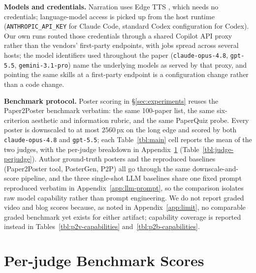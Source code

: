 \documentclass{article}
\begin{document}
\textbf{Models and credentials.} Narration uses Edge TTS \citep{edgetts}, which needs no credentials; language-model access is picked up from the host runtime (\texttt{ANTHROPIC\_API\_KEY} for Claude Code, standard Codex configuration for Codex). Our own runs routed those credentials through a shared Copilot API proxy rather than the vendors' first-party endpoints, with jobs spread across several hosts; the model identifiers used throughout the paper (\texttt{claude-opus-4.8}, \texttt{gpt-5.5}, \texttt{gemini-3.1-pro}) name the underlying models as served by that proxy, and pointing the same skills at a first-party endpoint is a configuration change rather than a code change.

\textbf{Benchmark protocol.} Poster scoring in \S\ref{sec:experiments} reuses the Paper2Poster benchmark \citep{paper2poster} verbatim: the same 100-paper list, the same six-criterion aesthetic and information rubric, and the same PaperQuiz probe. Every poster is downscaled to at most $2560$\,px on the long edge and scored by both \texttt{claude-opus-4.8} and \texttt{gpt-5.5}; each Table~\ref{tbl:main} cell reports the mean of the two judges, with the per-judge breakdown in Appendix~\ref{app:judges} (Table~\ref{tbl:judge-perjudge}). Author ground-truth posters and the reproduced baselines (Paper2Poster tool, PosterGen, P2P) all go through the same downscale-and-score pipeline, and the three single-shot LLM baselines share one fixed prompt reproduced verbatim in Appendix~\ref{app:llm-prompt}, so the comparison isolates raw model capability rather than prompt engineering. We do not report graded video and blog scores because, as noted in Appendix~\ref{app:limit}, no comparable graded benchmark yet exists for either artifact; capability coverage is reported instead in Tables~\ref{tbl:p2v-capabilities} and~\ref{tbl:p2b-capabilities}.

\section{Per-judge Benchmark Scores}\label{app:judges}
\end{document}
